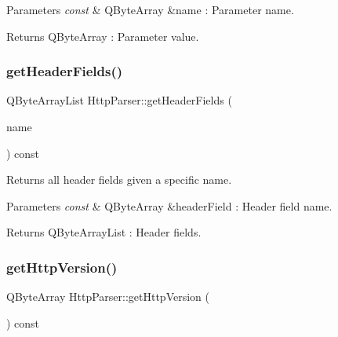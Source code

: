 \begin{DoxyParams}{Parameters}
{\em const} & Q\+Byte\+Array \&name \+: Parameter name. \\
\hline
\end{DoxyParams}
\begin{DoxyReturn}{Returns}
Q\+Byte\+Array \+: Parameter value. 
\end{DoxyReturn}
\mbox{\label{class_http_parser_ad1db732c8824dd7e91653fd956fc3bf5}} 
\subsubsection{\texorpdfstring{get\+Header\+Fields()}{getHeaderFields()}}
{\footnotesize\ttfamily Q\+Byte\+Array\+List Http\+Parser\+::get\+Header\+Fields (\begin{DoxyParamCaption}\item[{const Q\+Byte\+Array \&}]{name }\end{DoxyParamCaption}) const\hspace{0.3cm}{\ttfamily [inline]}}



Returns all header fields given a specific name. 


\begin{DoxyParams}{Parameters}
{\em const} & Q\+Byte\+Array \&header\+Field \+: Header field name. \\
\hline
\end{DoxyParams}
\begin{DoxyReturn}{Returns}
Q\+Byte\+Array\+List \+: Header fields. 
\end{DoxyReturn}
\mbox{\label{class_http_parser_a760eb9ec81fa1983b8eb5b088b0e6f41}} 
\subsubsection{\texorpdfstring{get\+Http\+Version()}{getHttpVersion()}}
{\footnotesize\ttfamily Q\+Byte\+Array Http\+Parser\+::get\+Http\+Version (\begin{DoxyParamCaption}{ }\end{DoxyParamCaption}) const\hspace{0.3cm}{\ttfamily [inline]}}



